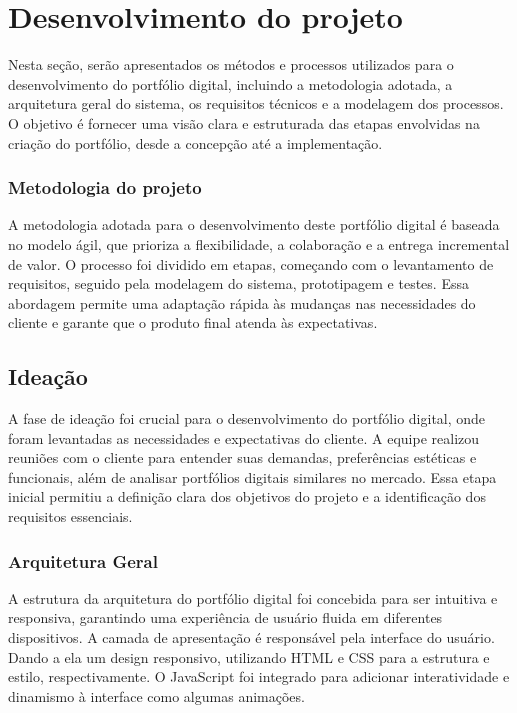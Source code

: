 \chapter{Desenvolvimento do projeto}
\label{chap:metod}
 Nesta seção, serão apresentados os métodos e processos utilizados para o desenvolvimento do portfólio digital, incluindo a metodologia adotada, a arquitetura geral do sistema, os requisitos técnicos e a modelagem dos processos. O objetivo é fornecer uma visão clara e estruturada das etapas envolvidas na criação do portfólio, desde a concepção até a implementação.

\subsection{Metodologia do projeto}
    A metodologia adotada para o desenvolvimento deste portfólio digital é baseada no modelo ágil, que prioriza a flexibilidade, a colaboração e a entrega incremental de valor. O processo foi dividido em etapas, começando com o levantamento de requisitos, seguido pela modelagem do sistema, prototipagem e testes. Essa abordagem permite uma adaptação rápida às mudanças nas necessidades do cliente e garante que o produto final atenda às expectativas.

\section{Ideação}

A fase de ideação foi crucial para o desenvolvimento do portfólio digital, onde foram levantadas as necessidades e expectativas do cliente. A equipe realizou reuniões com o cliente para entender suas demandas, preferências estéticas e funcionais, além de analisar portfólios digitais similares no mercado. Essa etapa inicial permitiu a definição clara dos objetivos do projeto e a identificação dos requisitos essenciais.

\subsection{Arquitetura Geral}
 A estrutura da arquitetura do portfólio digital foi concebida para ser intuitiva e responsiva, garantindo uma experiência de usuário fluida em diferentes dispositivos. A camada de apresentação é responsável pela interface do usuário. Dando a ela um design responsivo, utilizando HTML e CSS para a estrutura e estilo, respectivamente. O JavaScript foi integrado para adicionar interatividade e dinamismo à interface como algumas animações.


